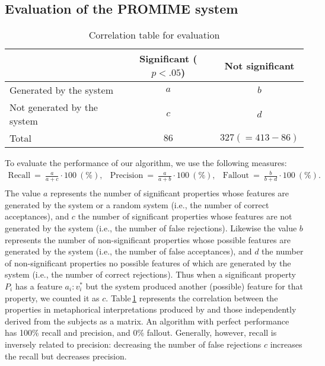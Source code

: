 \subsection{Evaluation of the {\sfb PROMIME} system}

\begin{table}[t]
  \caption{Correlation table for evaluation} \label{tbl:matrix}
  \begin{center}
    \small
    \begin{tabular}{|l|c|c|} \hline
      & Significant ($p<.05$) & Not significant\\ \hline
      Generated by the system & $a$ & $b$ \\ \hline
      Not generated by the system & $c$ & $d$ \\ \hline\hline
      Total & $86$ & $327(=413-86)$\\ \hline
    \end{tabular}
  \end{center}
\end{table}

To evaluate the performance of our algorithm, 
we use the following measures:
{\small
\[
\begin{array}{lll}
  \displaystyle
  \mbox{Recall} ~=~ \frac{a}{a+c} \cdot 100 ~(\%), & 
  \displaystyle
  \mbox{Precision} ~=~ \frac{a}{a+b} \cdot 100 ~(\%), &
  \displaystyle
  \mbox{Fallout} ~=~ \frac{b}{b+d} \cdot 100 ~(\%). \\
\end{array}
\]}
The value $a$ represents the number of significant properties whose features
are generated by the \SNAME\/ system or a random system 
(i.e., the number of correct acceptances), and
$c$ the number of significant properties whose features are not generated 
by the system (i.e., the number of false rejections). 
Likewise the value $b$ represents the number of non-significant properties whose possible features are generated by the system (i.e., the number of false acceptances), and 
$d$ the number of non-significant properties no possible features of which 
are generated by the system (i.e., the number of correct rejections).
Thus when a significant property $P_i$ has a feature $a_i:v^{*}_i$ but
the system produced another (possible) feature for that property, we counted it as $c$.
Table\,\ref{tbl:matrix} represents 
the correlation between the properties in metaphorical interpretations
produced by \SNAME\/ and those independently derived from the subjects as a matrix.
An algorithm with perfect performance has 100\% recall and precision, and 0\% fallout.
Generally, however, recall is inversely related to precision:
decreasing the number of false rejections $c$ increases the recall but
decreases precision.

